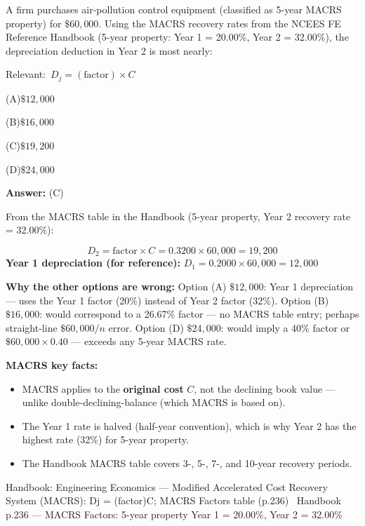 \documentclass[11pt]{article}
\newcommand{\correct}[1]{\textbf{#1}\;{\color{accent}$\checkmark$}}
\newcommand{\optline}[2]{\par\noindent\hspace{1.2em}(#1)\hspace{0.6em}#2}
\begin{document}
A firm purchases air-pollution control equipment (classified as 5-year MACRS property) for $\$60{,}000$. Using the MACRS recovery rates from the NCEES FE Reference Handbook (5-year property: Year 1 = 20.00\%, Year 2 = 32.00\%), the depreciation deduction in Year 2 is most nearly:\par\par\vspace{3pt}
{\small\color{soft}Relevant:}\ $D_j = (\text{factor}) \times C$\par\vspace{3pt}
\optline{A}{$\$12{,}000$}
\optline{B}{$\$16{,}000$}
\optline{C}{\correct{$\$19{,}200$}}
\optline{D}{$\$24{,}000$}
\par\vspace{3pt}
\vspace{2pt}\par\noindent\colorbox{boxbg}{\parbox{\dimexpr\linewidth-2\fboxsep\relax}{%
\vspace{2pt}\textbf{Answer:} (C)\par\vspace{2pt}
{\small From the MACRS table in the Handbook (5-year property, Year 2 recovery rate = 32.00\%):\par
\[D_2 = \text{factor} \times C = 0.3200 \times 60{,}000 = 19{,}200\]
\textbf{Year 1 depreciation (for reference):} $D_1 = 0.2000 \times 60{,}000 = 12{,}000$\par
\textbf{Why the other options are wrong:} Option (A) $\$12{,}000$: Year 1 depreciation --- uses the Year 1 factor (20\%) instead of Year 2 factor (32\%). Option (B) $\$16{,}000$: would correspond to a 26.67\% factor --- no MACRS table entry; perhaps straight-line $\$60{,}000/n$ error. Option (D) $\$24{,}000$: would imply a 40\% factor or $\$60{,}000 \times 0.40$ --- exceeds any 5-year MACRS rate.\par
\textbf{MACRS key facts:}\par
\begin{itemize}\setlength{\itemsep}{0pt}\setlength{\parskip}{0pt}
\item MACRS applies to the \textbf{original cost} $C$, not the declining book value --- unlike double-declining-balance (which MACRS is based on).
\item The Year 1 rate is halved (half-year convention), which is why Year 2 has the highest rate (32\%) for 5-year property.
\item The Handbook MACRS table covers 3-, 5-, 7-, and 10-year recovery periods.
\end{itemize}}\par\vspace{2pt}
{\footnotesize\color{soft}Handbook: Engineering Economics --- Modified Accelerated Cost Recovery System (MACRS): Dj = (factor)C; MACRS Factors table (p.236) \textbullet\ Handbook p.236 --- MACRS Factors: 5-year property Year 1 = 20.00\%, Year 2 = 32.00\%}\vspace{2pt}
}}
\end{document}
